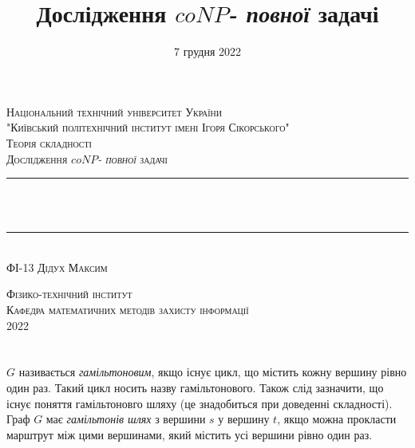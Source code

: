 \documentclass[14pt]{article}
\begin{document}
\begin{spacing}{1.175}	
	\begin{titlepage} 
		\newcommand{\HRule}{\rule{\linewidth}{0.3mm}}
		\center 
		
		\textsc{\large Національний технічний університет України
			\\"Київський політехнічний інститут імені Ігоря Сікорського"}\\[1.5cm]
		
		\vspace{5cm}
		\textsc{\large Теорія складності}\\[0.5cm]
		
		\textsc{\large Дослідження \(coNP\)\textit{- повної} задачі}\\[0.5cm] 
		
		\HRule\\[0.4cm]
		
		{\huge {}}\\[0.4cm]
		
		\HRule\\[1.5cm]
		\textsc{\large ФІ-13 Дідух Максим}\\[0.5cm]
		
		\vspace{9cm}
		
		\textsc{\large Фізико-технічний інститут}\\[0.5cm]
		\textsc{\large Кафедра математичних методів захисту інформації}\\[0.5cm]
		{\large {2022}} 
	\end{titlepage}
    
    
    
    \newpage
    \title{\Large Дослідження \(coNP\)\textit{- повної} задачі}
    \date{\large 7 грудня 2022}
    \maketitle
    \tableofcontents                                                                            %
    \newpage
    \section{}
         \(G\) називається \textit{гамільтоновим}, якщо існує цикл, що містить кожну вершину рівно один раз. Такий цикл носить назву гамільтонового. Також слід зазначити, що існує поняття гамільтоновго шляху (це знадобиться при доведенні складності). Граф \(G\) має \textit{гамільтонів шлях} з вершини \(s\) у вершину \(t\), якщо можна прокласти марштрут між цими вершинами, який містить усі вершини рівно один раз.
        

\end{spacing}
\end{document}
